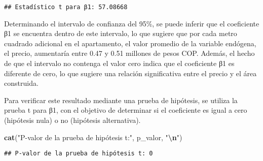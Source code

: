 \documentclass[
]{article}
\newenvironment{Shaded}{\begin{snugshade}}{\end{snugshade}}
\newcommand{\AttributeTok}[1]{\textcolor[rgb]{0.13,0.29,0.53}{#1}}
\newcommand{\CommentTok}[1]{\textcolor[rgb]{0.56,0.35,0.01}{\textit{#1}}}
\newcommand{\DecValTok}[1]{\textcolor[rgb]{0.00,0.00,0.81}{#1}}
\newcommand{\FunctionTok}[1]{\textcolor[rgb]{0.13,0.29,0.53}{\textbf{#1}}}
\newcommand{\NormalTok}[1]{#1}
\newcommand{\OtherTok}[1]{\textcolor[rgb]{0.56,0.35,0.01}{#1}}
\newcommand{\SpecialCharTok}[1]{\textcolor[rgb]{0.81,0.36,0.00}{\textbf{#1}}}
\newcommand{\StringTok}[1]{\textcolor[rgb]{0.31,0.60,0.02}{#1}}
\begin{document}
\begin{Shaded}
\end{Shaded}

\begin{verbatim}
## Estadístico t para β1: 57.08668
\end{verbatim}

Determinando el intervalo de confianza del 95\%, se puede inferir que el
coeficiente β1 se encuentra dentro de este intervalo, lo que sugiere que
por cada metro cuadrado adicional en el apartamento, el valor promedio
de la variable endógena, el precio, aumentaría entre 0.47 y 0.51
millones de pesos COP. Además, el hecho de que el intervalo no contenga
el valor cero indica que el coeficiente β1 es diferente de cero, lo que
sugiere una relación significativa entre el precio y el área construida.

Para verificar este resultado mediante una prueba de hipótesis, se
utiliza la prueba t para β1, con el objetivo de determinar si el
coeficiente es igual a cero (hipótesis nula) o no (hipótesis
alternativa).

\begin{Shaded}
\begin{Highlighting}[]
\FunctionTok{cat}\NormalTok{(}\StringTok{"P{-}valor de la prueba de hipótesis t:"}\NormalTok{, p\_valor, }\StringTok{"}\SpecialCharTok{\textbackslash{}n}\StringTok{"}\NormalTok{)}
\end{Highlighting}
\end{Shaded}

\begin{verbatim}
## P-valor de la prueba de hipótesis t: 0
\end{verbatim}
\end{document}

